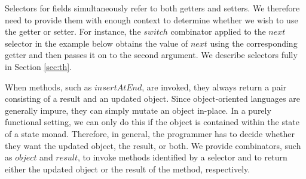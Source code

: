 \documentclass[authoryear,preprint]{sigplanconf}
\begin{document}
Selectors for fields simultaneously refer to both getters and setters. We therefore need to provide them with enough context to determine whether we wish to use the getter or setter. For instance, the $\mathit{switch}$ combinator applied to the $\mathit{next}$ selector in the example below obtains the value of $\mathit{next}$ using the corresponding getter and then passes it on to the second argument. We describe selectors fully in Section \ref{sec:th}.

When methods, such as $\mathit{insertAtEnd}$, are invoked, they always return a pair consisting of a result and an updated object. Since object-oriented languages are generally impure, they can simply mutate an object in-place. In a purely functional setting, we can only do this if the object is contained within the state of a state monad. Therefore, in general, the programmer has to decide whether they want the updated object, the result, or both. We provide combinators, such as $\mathit{object}$ and $\mathit{result}$, to invoke methods identified by a selector and to return either the updated object or the result of the method, respectively.
\end{document}
